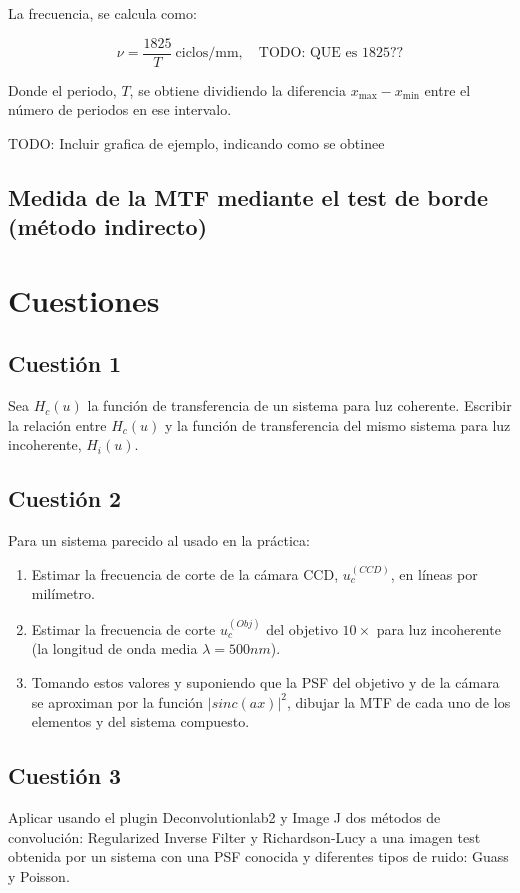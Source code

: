 \documentclass{./packages/optica-article}
\begin{document}
La frecuencia, se calcula como:

\begin{equation}
	\nu = \frac{1825}{T}\ \textrm{ciclos/mm},\quad\textrm{TODO: QUE es 1825??}
	\label{eq:frecuencia}
\end{equation}

Donde el periodo, $T$, se obtiene dividiendo la diferencia $x_{\max} - x_{\min}$ entre el número de periodos en ese intervalo.

TODO: Incluir grafica de ejemplo, indicando como se obtinee

\subsection{Medida de la MTF mediante el test de borde (método indirecto)}

\section{Cuestiones}

\subsection{Cuestión 1}
Sea $H_{c}(u)$ la función de transferencia de un sistema para luz coherente. Escribir la relación entre $H_{c}(u)$ y la función de transferencia del mismo sistema para luz incoherente, $H_{i}(u)$.


\subsection{Cuestión 2}
Para un sistema parecido al usado en la práctica:
\begin{enumerate}
	\item Estimar la frecuencia de corte de la cámara CCD, $u_{c}^{(CCD)}$, en líneas por milímetro.

	\item Estimar la frecuencia de corte $u_{c}^{(Obj)}$ del objetivo $10\times$ para luz incoherente (la longitud de onda media $\lambda=500nm$).

	\item Tomando estos valores y suponiendo que la PSF del objetivo y de la cámara se aproximan por la función $|sinc(ax)|^2$, dibujar la MTF de cada uno de los elementos y del sistema compuesto.
\end{enumerate}


\subsection{Cuestión 3}
Aplicar usando el plugin Deconvolutionlab2 y Image J dos métodos de convolución: Regularized Inverse Filter y Richardson-Lucy a una imagen test obtenida por un sistema con una PSF conocida y diferentes tipos de ruido: Guass y Poisson.


\end{document}
